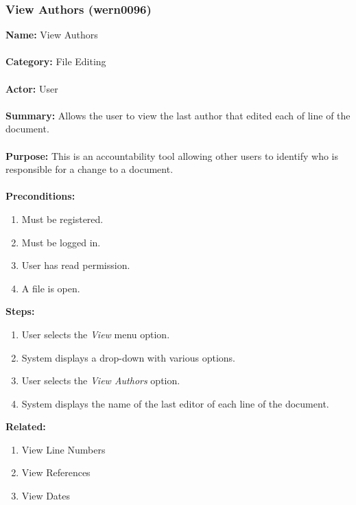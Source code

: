 \documentclass[11pt]{report}
\begin{document}
\subsubsection{View Authors (wern0096)}
\begin{framed}
	\noindent\textbf{Name:} View Authors \\ \\
	\textbf{Category:} File Editing \\ \\
	\textbf{Actor:} User \\ \\
	\textbf{Summary:} Allows the user to view the last author that edited each of line of the document. \\ \\
	\textbf{Purpose:} This is an accountability tool allowing other users to identify who is responsible for a change to a document. \\ \\
	\textbf{Preconditions:} 
	\begin{enumerate}
		\item Must be registered.
		\item Must be logged in.
		\item User has read permission.
		\item A file is open.
	\end{enumerate}
	\textbf{Steps:}
	\begin{enumerate}
		\item User selects the \textit{View} menu option.
		\item System displays a drop-down with various options.
		\item User selects the \textit{View Authors} option.
		\item System displays the name of the last editor of each line of the document.
	\end{enumerate}
	\textbf{Related:}
	\begin{enumerate}
		\item View Line Numbers
		\item View References
		\item View Dates
	\end{enumerate}
\end{framed}

\newpage
\end{document}
